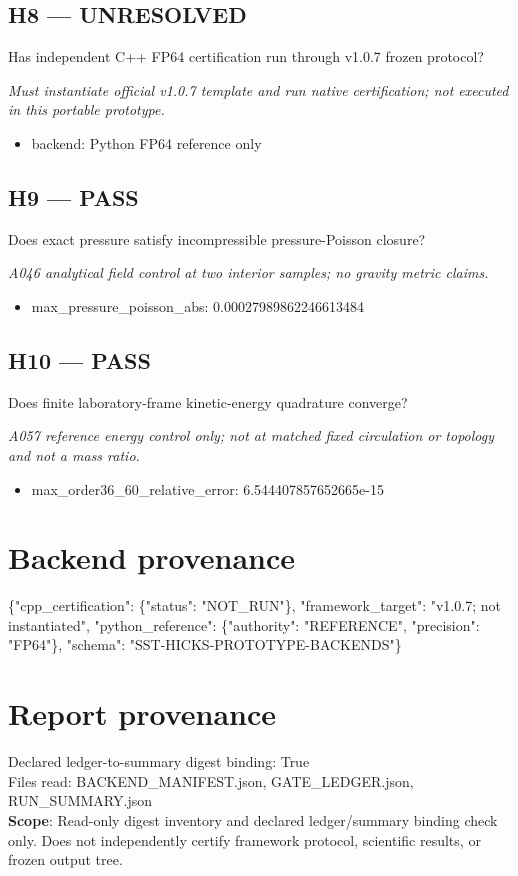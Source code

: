 \documentclass[10pt,a4paper]{article}
\begin{document}
\subsection*{H8 --- UNRESOLVED}
Has independent C++ FP64 certification run through v1.0.7 frozen protocol?
\par\textit{Must instantiate official v1.0.7 template and run native certification; not executed in this portable prototype.}\par
\begin{itemize}
\item backend: Python FP64 reference only
\end{itemize}
\subsection*{H9 --- PASS}
Does exact pressure satisfy incompressible pressure-Poisson closure?
\par\textit{A046 analytical field control at two interior samples; no gravity metric claims.}\par
\begin{itemize}
\item max\_pressure\_poisson\_abs: 0.00027989862246613484
\end{itemize}
\subsection*{H10 --- PASS}
Does finite laboratory-frame kinetic-energy quadrature converge?
\par\textit{A057 reference energy control only; not at matched fixed circulation or topology and not a mass ratio.}\par
\begin{itemize}
\item max\_order36\_60\_relative\_error: 6.544407857652665e-15
\end{itemize}
\section*{Backend provenance}
\{"cpp\_certification": \{"status": "NOT\_RUN"\}, "framework\_target": "v1.0.7; not instantiated", "python\_reference": \{"authority": "REFERENCE", "precision": "FP64"\}, "schema": "SST-HICKS-PROTOTYPE-BACKENDS"\}
\section*{Report provenance}
Declared ledger-to-summary digest binding: True\\
Files read: BACKEND\_MANIFEST.json, GATE\_LEDGER.json, RUN\_SUMMARY.json\\
\textbf{Scope}: Read-only digest inventory and declared ledger/summary binding check only. Does not independently certify framework protocol, scientific results, or frozen output tree.
\end{document}
